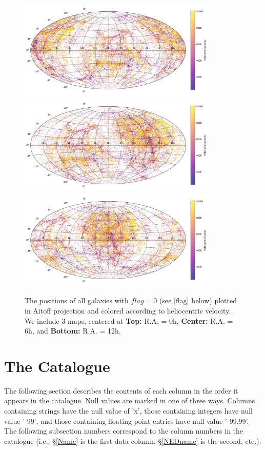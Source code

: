 \documentclass[twocolumn,tighten]{aastex62}
\begin{document}
\begin{figure}[ht!]
        \centering
        \vspace{0pt}
        \includegraphics[width=0.85\textwidth]{all_sky.pdf} \label{a}
        \includegraphics[width=0.85\textwidth]{all_sky_6h.pdf} \label{b}
        \includegraphics[width=0.85\textwidth]{all_sky_12h.pdf} \label{c}
        \caption{\small{The positions of all galaxies with $flag=0$ (see \ref{flag} below) plotted in Aitoff projection and colored according to heliocentric velocity. We include 3 maps, centered at \textbf{Top:} R.A. = 0h, \textbf{Center:} R.A. = 6h, and \textbf{Bottom:} R.A. = 12h. }}
        \vspace{5pt}
        \label{allskyvhel}
\end{figure}


\section{The Catalogue}
The following section describes the contents of each column in the order it appears in the catalogue. Null values are marked in one of three ways. Columns containing strings have the null value of 'x', those containing integers have null value '-99', and those containing floating point entries have null value '-99.99'. The following subsection numbers correspond to the column numbers in the catalogue (i.e., \S \ref{Name} is the first data column, \S \ref{NEDname} is the second, etc.).
\end{document}
